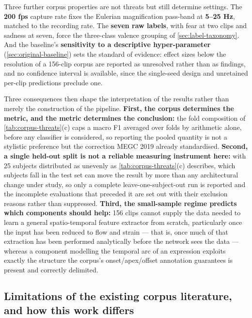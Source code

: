 Three further corpus properties are not threats but still determine settings. The \textbf{200 fps} capture rate fixes the Eulerian magnification pass-band at \textbf{5--25 Hz}, matched to the recording rate. The \textbf{seven raw labels}, with fear at two clips and sadness at seven, force the three-class valence grouping of \autoref{sec:label-taxonomy}. And the baseline's \textbf{sensitivity to a descriptive hyper-parameter} (\autoref{sec:original-baseline}) sets the standard of evidence: effect sizes below the resolution of a 156-clip corpus are reported as unresolved rather than as findings, and no confidence interval is available, since the single-seed design and unretained per-clip predictions preclude one.

Three consequences then shape the interpretation of the results rather than merely the construction of the pipeline. \textbf{First, the corpus determines the metric, and the metric determines the conclusion:} the fold composition of \autoref{tab:corpus-threats}(c) caps a macro F1 averaged over folds by arithmetic alone, before any classifier is considered, so reporting the pooled quantity is not a stylistic preference but the correction MEGC 2019 already standardised. \textbf{Second, a single held-out split is not a reliable measuring instrument here:} with 25 subjects distributed as unevenly as \autoref{tab:corpus-threats}(c) describes, which subjects fall in the test set can move the result by more than any architectural change under study, so only a complete leave-one-subject-out run is reported and the incomplete evaluations that preceded it are set out with their exclusion reasons rather than suppressed. \textbf{Third, the small-sample regime predicts which components should help:} 156 clips cannot supply the data needed to learn a general spatio-temporal feature extractor from scratch, particularly once the input has been reduced to flow and strain --- that is, once much of that extraction has been performed analytically before the network sees the data --- whereas a component modelling the temporal arc of an expression exploits exactly the structure the corpus's onset/apex/offset annotation guarantees is present and correctly delimited.

\subsection{Limitations of the existing corpus literature, and how this work differs}
\label{sec:corpus-lit-limitations}

